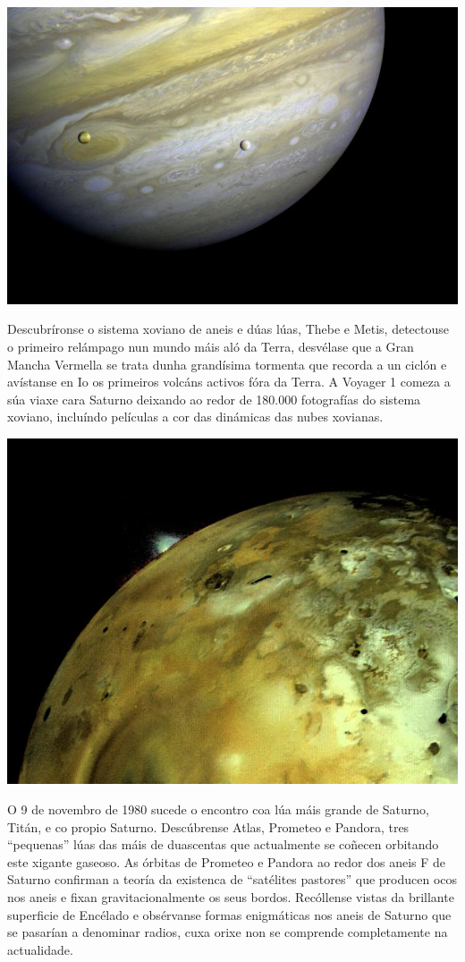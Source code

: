 \begin{refsection}
\begin{multicols}{2}
\begin{center}
    \includegraphics[width=0.9\linewidth]{revistas/002/imaxes/jupiter.jpg}
\end{center}

Descubríronse o sistema xoviano de aneis e dúas lúas, Thebe e Metis, detectouse
o primeiro relámpago nun mundo máis aló da Terra, desvélase que a Gran Mancha
Vermella se trata dunha grandísima tormenta que recorda a un ciclón e avístanse
en Io os primeiros volcáns activos fóra da Terra. A Voyager 1 comeza a súa
viaxe cara Saturno deixando ao redor de 180.000 fotografías do sistema xoviano,
incluíndo películas a cor das dinámicas das nubes xovianas.

\begin{center}
    \includegraphics[width=0.8\linewidth]{revistas/002/imaxes/io.jpg}
\end{center}

O 9 de novembro de 1980 sucede o encontro coa lúa máis grande de Saturno,
Titán, e co propio Saturno. Descúbrense Atlas, Prometeo e Pandora, tres
``pequenas'' lúas das máis de duascentas que actualmente se coñecen orbitando
este xigante gaseoso. As órbitas de Prometeo e Pandora ao redor dos aneis F de
Saturno confirman a teoría da existenca de ``satélites pastores'' que producen
ocos nos aneis e fixan gravitacionalmente os seus bordos. Recóllense vistas da
brillante superficie de Encélado e obsérvanse formas enigmáticas nos aneis de
Saturno que se pasarían a denominar radios, cuxa orixe non se comprende
completamente na actualidade.


\end{multicols}
\end{refsection}
